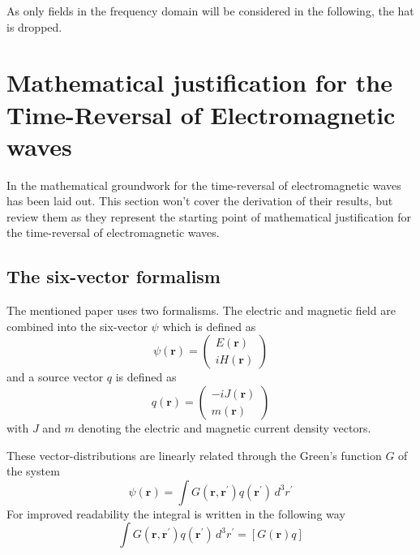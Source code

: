 As only fields in the frequency domain will be considered in the following, the hat is dropped.



\section{Mathematical justification for the Time-Reversal of Electromagnetic waves}\label{sec:math_foundations_em_tr}
In \parencite{de_rosny_theory_2010} the mathematical groundwork for the time-reversal of electromagnetic waves has been laid out.
This section won't cover the derivation of their results, but review them as they represent the starting point of mathematical justification for the time-reversal of electromagnetic waves.

\subsection{The six-vector formalism}
The mentioned paper uses two formalisms.
The electric and magnetic field are combined into the  six-vector \(\psi \) which is defined as
\begin{equation}
    \psi(\mathbf{r}) = \begin{pmatrix}
        E(\mathbf{r}) \\
        i H(\mathbf{r})
    \end{pmatrix}
\end{equation}
and a source vector \(q\) is defined as
\begin{equation}
    q(\mathbf{r}) = \begin{pmatrix}
        -i J(\mathbf{r}) \\
        m(\mathbf{r})
    \end{pmatrix}
\end{equation}
with \(J\) and \(m\) denoting the electric and magnetic current density vectors.

These vector-distributions are linearly related through the Green's function \(G\) of the system
\begin{equation}
    \psi(\mathbf{r}) = \int G(\mathbf{r}, \mathbf{r}^{\prime}) q(\mathbf{r}^{\prime}) \, d^3 r^{\prime}
\end{equation}
For improved readability the integral is written in the following way
\begin{equation}
    \int G(\mathbf{r}, \mathbf{r}^{\prime}) q(\mathbf{r}^{\prime}) \, d^3 r^{\prime} = [G(\mathbf{r}) q]
\end{equation}


